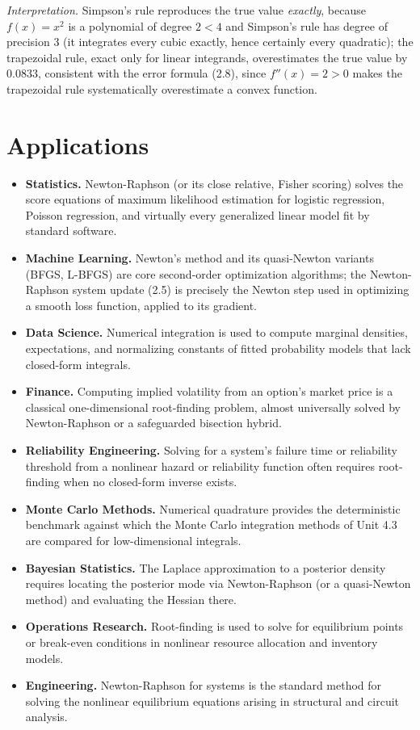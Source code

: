 \documentclass[
]{article}
\providecommand{\tightlist}{%
  \setlength{\itemsep}{0pt}\setlength{\parskip}{0pt}}
\begin{document}
\emph{Interpretation.} Simpson's rule reproduces the true value
\emph{exactly}, because \(f(x)=x^2\) is a polynomial of degree \(2<4\)
and Simpson's rule has degree of precision \(3\) (it integrates every
cubic exactly, hence certainly every quadratic); the trapezoidal rule,
exact only for linear integrands, overestimates the true value by
\(0.0833\), consistent with the error formula (2.8), since
\(f''(x)=2>0\) makes the trapezoidal rule systematically overestimate a
convex function.

\section{Applications}\label{applications}

\begin{itemize}
\tightlist
\item
  \textbf{Statistics.} Newton-Raphson (or its close relative, Fisher
  scoring) solves the score equations of maximum likelihood estimation
  for logistic regression, Poisson regression, and virtually every
  generalized linear model fit by standard software.
\item
  \textbf{Machine Learning.} Newton's method and its quasi-Newton
  variants (BFGS, L-BFGS) are core second-order optimization algorithms;
  the Newton-Raphson system update (2.5) is precisely the Newton step
  used in optimizing a smooth loss function, applied to its gradient.
\item
  \textbf{Data Science.} Numerical integration is used to compute
  marginal densities, expectations, and normalizing constants of fitted
  probability models that lack closed-form integrals.
\item
  \textbf{Finance.} Computing implied volatility from an option's market
  price is a classical one-dimensional root-finding problem, almost
  universally solved by Newton-Raphson or a safeguarded bisection
  hybrid.
\item
  \textbf{Reliability Engineering.} Solving for a system's failure time
  or reliability threshold from a nonlinear hazard or reliability
  function often requires root-finding when no closed-form inverse
  exists.
\item
  \textbf{Monte Carlo Methods.} Numerical quadrature provides the
  deterministic benchmark against which the Monte Carlo integration
  methods of Unit 4.3 are compared for low-dimensional integrals.
\item
  \textbf{Bayesian Statistics.} The Laplace approximation to a posterior
  density requires locating the posterior mode via Newton-Raphson (or a
  quasi-Newton method) and evaluating the Hessian there.
\item
  \textbf{Operations Research.} Root-finding is used to solve for
  equilibrium points or break-even conditions in nonlinear resource
  allocation and inventory models.
\item
  \textbf{Engineering.} Newton-Raphson for systems is the standard
  method for solving the nonlinear equilibrium equations arising in
  structural and circuit analysis.
\end{itemize}
\end{document}

